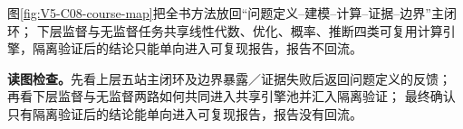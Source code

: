\documentclass[UTF8,a4paper,11pt,openany]{ctexbook}
\begin{document}
\setcounter{page}{753}
\setcounter{chapter}{37}
\setcounter{section}{5}
\setcounter{figure}{7}
\pagestyle{headings}
图\ref{fig:V5-C08-course-map}把全书方法放回“问题定义--建模--计算--证据--边界”主闭环；
下层监督与无监督任务共享线性代数、优化、概率、推断四类可复用计算引擎，隔离验证后的结论只能单向进入可复现报告，报告不回流。

\FloatBarrier
\noindent\textbf{读图检查。}先看上层五站主闭环及边界暴露／证据失败后返回问题定义的反馈；
再看下层监督与无监督两路如何共同进入共享引擎池并汇入隔离验证；
最终确认只有隔离验证后的结论能单向进入可复现报告，报告没有回流。
\end{document}
